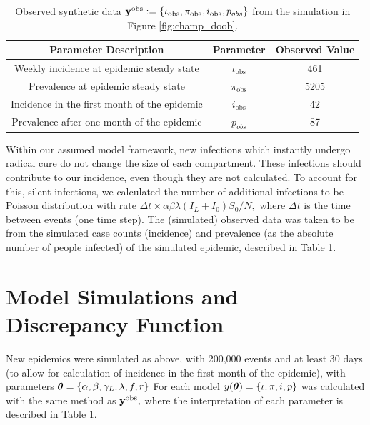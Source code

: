 \begin{table}[htbp]
    \caption{
        Observed synthetic data
        $\mathbf{y}^{\mathrm{obs}} := \{\iota_\text{obs}, \pi_\text{obs}, i_\text{obs}, p_{obs}\}$
        from the simulation in Figure \ref{fig:champ_doob}.
    }
    \label{tab:obs_data}
    \centering
    \begin{tabular}{c|c|c}
        Parameter Description                        & Parameter
                                                     & Observed Value     \\
        \hline
        Weekly incidence at epidemic steady state    & $\iota_\text{obs}$
                                                     & 461                \\
        Prevalence at epidemic steady state          & $\pi_\text{obs}$
                                                     & 5205               \\
        Incidence in the first month of the epidemic & $i_\text{obs}$
                                                     & 42                 \\
        Prevalence after one month of the epidemic   & $p_{obs}$
                                                     & 87                 \\
    \end{tabular}
\end{table}


Within our assumed model framework, 
new infections which instantly undergo radical cure do not change the size of
each compartment. These infections should contribute to our incidence, 
even though they are not calculated. To account for this, silent infections, 
we calculated the number of additional infections to be 
Poisson distribution with rate
$\Delta t \times \alpha \beta \lambda (I_L + I_0) S_0 / N,$ where $\Delta t$ is
the time between events (one time step).
The (simulated) observed data was taken to
be from the simulated case counts (incidence) and prevalence
(as the absolute number of people infected) of the
simulated epidemic, described in Table \ref{tab:obs_data}.

\section{Model Simulations and Discrepancy Function}

New epidemics were simulated as above, with 200,000 events and at least 30
days (to allow for calculation of incidence in the first month of the
epidemic), with parameters
$\bm{\theta} = \{\alpha, \beta, \gamma_L, \lambda, f, r\}$
For each model
$y(\bm{\theta}) = \{\iota, \pi, i, p\}$ was
calculated with the same method as $\mathbf{y}^{\mathrm{obs}},$ where the interpretation of each
parameter is described in Table \ref{tab:obs_data}.

